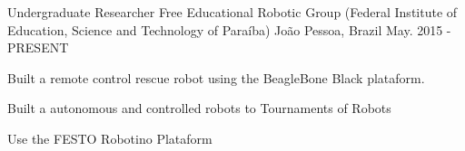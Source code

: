 

\begin{cventries}

    
  \cventry
    {Undergraduate Researcher} %
    {Free Educational Robotic Group (Federal Institute of Education, Science and Technology of Paraíba)} %
    {João Pessoa, Brazil} %
    {May. 2015 - PRESENT} %
    {
      \begin{cvitems} %
        \item {Built a remote control rescue robot using the BeagleBone Black plataform.}
        \item {Built a autonomous and controlled robots to Tournaments of Robots}
        \item {Use the FESTO Robotino Plataform}
      \end{cvitems}
    }


\end{cventries}
